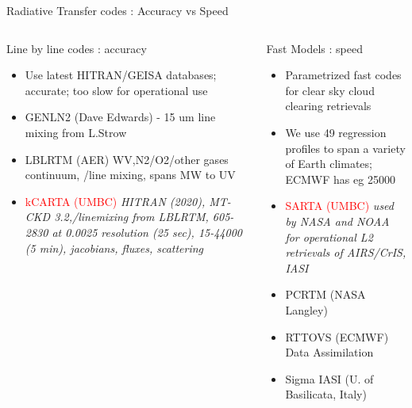 \documentclass[10pt,t]{beamer}
\begin{document}
\begin{frame}[shrink=2]{Radiative Transfer codes : Accuracy vs Speed}
\vspace{-0.1in}
\begin{columns}

\begin{column}{0.55\columnwidth}
\begin{block}{Line by line codes : accuracy}
  \begin{itemize}
  \item Use latest HITRAN/GEISA databases; accurate; too slow for operational use
  \item GENLN2 (Dave Edwards) - 15 um \cd line mixing from L.Strow
  \item LBLRTM (AER) WV,N2/O2/other gases continuum, \cd/\methane line mixing, spans MW to UV
  \item \textcolor{red}{kCARTA (UMBC)} \emph{HITRAN (2020), MT-CKD 3.2,\cd/\methane linemixing from LBLRTM, 
        605-2830 \wn at 0.0025 \wn resolution (25 sec), 15-44000 \wn (5 min), jacobians, 
        fluxes, scattering}
  \end{itemize}
\end{block}
\end{column}

\begin{column}{0.55\columnwidth}
\begin{block}{Fast Models : speed}
  \begin{itemize}
  \item Parametrized fast codes for clear sky cloud clearing retrievals
  \item We use 49 regression profiles to span a variety of Earth climates; ECMWF has eg 25000
  \item \textcolor{red}{SARTA (UMBC)} \emph{used by NASA and NOAA for operational L2 retrievals of AIRS/CrIS, IASI}
  \item PCRTM (NASA Langley)
  \item RTTOVS (ECMWF) Data Assimilation
  \item Sigma IASI (U. of Basilicata, Italy) 
  \end{itemize}
\end{block}
\end{column}
\end{columns}
\end{frame}

\end{document}
